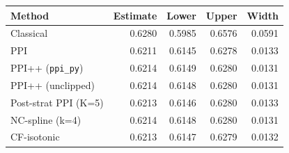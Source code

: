 \begin{tabular}{lrrrr}
\toprule
Method & Estimate & Lower & Upper & Width \\
\midrule
Classical & 0.6280 & 0.5985 & 0.6576 & 0.0591 \\
PPI & 0.6211 & 0.6145 & 0.6278 & 0.0133 \\
PPI++ (\texttt{ppi\_py}) & 0.6214 & 0.6149 & 0.6280 & 0.0131 \\
PPI++ (unclipped) & 0.6214 & 0.6148 & 0.6280 & 0.0131 \\
Post-strat PPI (K=5) & 0.6213 & 0.6146 & 0.6280 & 0.0133 \\
NC-spline (k=4) & 0.6214 & 0.6148 & 0.6280 & 0.0131 \\
CF-isotonic & 0.6213 & 0.6147 & 0.6279 & 0.0132 \\
\bottomrule
\end{tabular}